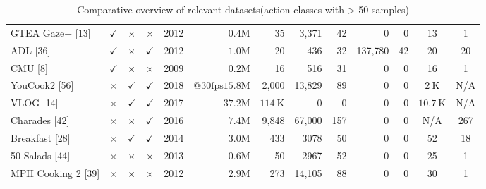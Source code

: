 \begin{table}[t]
{\begin{tabular}{|l|c|c|c|c|r|r|r|r|r|r|c|c|}
    GTEA Gaze+ [13] & $\checkmark$ & $\times$ & $\times$ & 2012 & $0.4 \mathrm{M}$ & 35 & 3,371 & 42 & 0 & 0 & 13 & 1 \\
    ADL [36] & $\checkmark$ & $\times$ & $\checkmark$ & 2012 & $1.0 \mathrm{M}$ & 20 & 436 & 32 & 137,780 & 42 & 20 & 20 \\
    CMU [8] & $\checkmark$ & $\times$ & $\times$ & 2009 & $0.2 \mathrm{M}$ & 16 & 516 & 31 & 0 & 0 & 16 & 1 \\
    \hline YouCook2 [56] & $\times$ & $\checkmark$ & $\checkmark$ & 2018 & $@ 30 \mathrm{fps} 15.8 \mathrm{M}$ & 2,000 & 13,829 & 89 & 0 & 0 & $2 \mathrm{~K}$ & N/A \\
    VLOG [14] & $\times$ & $\checkmark$ & $\checkmark$ & 2017 & $37.2 \mathrm{M}$ & $114 \mathrm{~K}$ & 0 & 0 & 0 & 0 & $10.7 \mathrm{~K}$ & N/A \\
    Charades [42] & $\times$ & $\times$ & $\checkmark$ & 2016 & $7.4 \mathrm{M}$ & 9,848 & 67,000 & 157 & 0 & 0 & N/A & 267 \\
    Breakfast [28] & $\times$ & $\checkmark$ & $\checkmark$ & 2014 & $3.0 \mathrm{M}$ & 433 & 3078 & 50 & 0 & 0 & 52 & 18 \\
    50 Salads [44] & $\times$ & $\times$ & $\times$ & 2013 & $0.6 \mathrm{M}$ & 50 & 2967 & 52 & 0 & 0 & 25 & 1 \\
    MPII Cooking 2 [39] & $\times$ & $\times$ & $\times$ & 2012 & $2.9 \mathrm{M}$ & 273 & 14,105 & 88 & 0 & 0 & 30 & 1 \\
    \hline
    \end{tabular}}
    \caption{Comparative overview of relevant datasets(action classes with > 50 samples)}
    \label{tab:epic_comparison}
\end{table}
